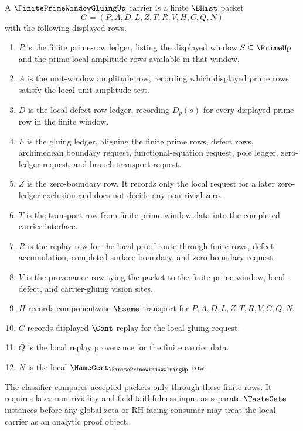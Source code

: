 \begin{definition}
\label{def:finite-prime-window-gluing-carrier}
A $\FinitePrimeWindowGluingUp$ carrier is a finite $\BHist$ packet
$$
G=(P,A,D,L,Z,T,R,V,H,C,Q,N)
$$
with the following displayed rows.
\begin{enumerate}
\item $P$ is the finite prime-row ledger, listing the displayed window $S\subseteq\PrimeUp$ and the prime-local amplitude rows available in that window.
\item $A$ is the unit-window amplitude row, recording which displayed prime rows satisfy the local unit-amplitude test.
\item $D$ is the local defect-row ledger, recording $D_p(s)$ for every displayed prime row in the finite window.
\item $L$ is the gluing ledger, aligning the finite prime rows, defect rows, archimedean boundary request, functional-equation request, pole ledger, zero-ledger request, and branch-transport request.
\item $Z$ is the zero-boundary row. It records only the local request for a later zero-ledger exclusion and does not decide any nontrivial zero.
\item $T$ is the transport row from finite prime-window data into the completed carrier interface.
\item $R$ is the replay row for the local proof route through finite rows, defect accumulation, completed-surface boundary, and zero-boundary request.
\item $V$ is the provenance row tying the packet to the finite prime-window, local-defect, and carrier-gluing vision sites.
\item $H$ records componentwise $\hsame$ transport for $P,A,D,L,Z,T,R,V,C,Q,N$.
\item $C$ records displayed $\Cont$ replay for the local gluing request.
\item $Q$ is the local replay provenance for the finite carrier data.
\item $N$ is the local $\NameCert_{\FinitePrimeWindowGluingUp}$ row.
\end{enumerate}
The classifier compares accepted packets only through these finite rows. It requires later nontriviality and field-faithfulness input as separate $\TasteGate$ instances before any global zeta or RH-facing consumer may treat the local carrier as an analytic proof object.
\end{definition}

